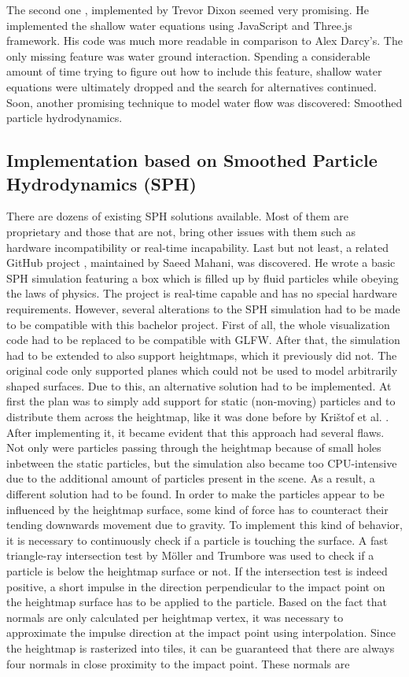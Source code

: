 \documentclass[11pt,a4paper,twoside,openright]{report}
\begin{document}
The second one \cite{Dixon}, implemented by Trevor Dixon seemed very promising. He implemented the shallow water equations using JavaScript and Three.js framework. His code was much more readable in comparison to Alex Darcy's. The only missing feature was water ground interaction. Spending a considerable amount of time trying to figure out how to include this feature, shallow water equations were ultimately dropped and the search for alternatives continued. Soon, another promising technique to model water flow was discovered: Smoothed particle hydrodynamics.

\subsection{Implementation based on Smoothed Particle Hydrodynamics (SPH)}
There are dozens of existing SPH solutions available. Most of them are proprietary and those that are not, bring other issues with them such as hardware incompatibility or real-time incapability. Last but not least, a related GitHub project \cite{Mahani}, maintained by Saeed Mahani, was discovered. He wrote a basic SPH simulation featuring a box which is filled up by fluid particles while obeying the laws of physics. The project is real-time capable and has no special hardware requirements. However, several alterations to the SPH simulation had to be made to be compatible with this bachelor project. First of all, the whole visualization code had to be replaced to be compatible with GLFW. After that, the simulation had to be extended to also support heightmaps, which it previously did not. The original code only supported planes which could not be used to model arbitrarily shaped surfaces. Due to this, an alternative solution had to be implemented. At first the plan was to simply add support for static (non-moving) particles and to distribute them across the heightmap, like it was done before by Kri\v{s}tof et al. \cite{krivstof2009hydraulic}. After implementing it, it became evident that this approach had several flaws. Not only were particles passing through the heightmap because of small holes inbetween the static particles, but the simulation also became too CPU-intensive due to the additional amount of particles present in the scene. As a result, a different solution had to be found. In order to make the particles appear to be influenced by the heightmap surface, some kind of force has to counteract their tending downwards movement due to gravity. To implement this kind of behavior, it is necessary to continuously check if a particle is touching the surface. A fast triangle-ray intersection test by Möller and Trumbore \cite{moller2005fast} was used to check if a particle is below the heightmap surface or not. If the intersection test is indeed positive, a short impulse in the direction perpendicular to the impact point on the heightmap surface has to be applied to the particle. Based on the fact that normals are only calculated per heightmap vertex, it was necessary to approximate the impulse direction at the impact point using interpolation. Since the heightmap is rasterized into tiles, it can be guaranteed that there are always four normals in close proximity to the impact point. These normals are 
\end{document}
